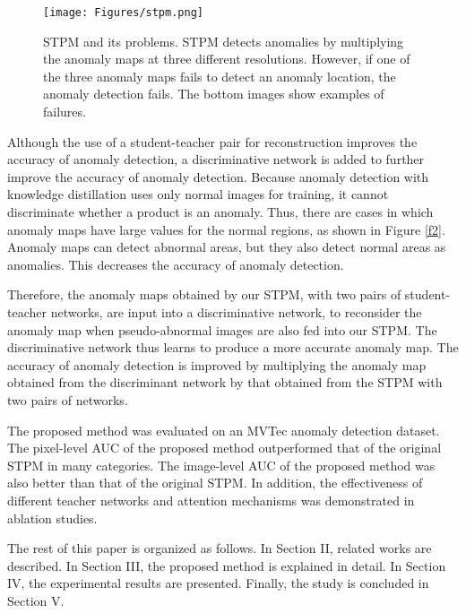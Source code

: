 \documentclass[letterpaper, 10 pt, conference]{ieeeconf}
\begin{document}
\begin{figure}[t]
\begin{center}
\vspace{0.2cm}
\texttt{[image: Figures/stpm.png]}
\end{center}

\caption{STPM and its problems. STPM detects anomalies by multiplying the anomaly maps at three different resolutions. However, if one of the three anomaly maps fails to detect an anomaly location, the anomaly detection fails. The bottom images show examples of failures.}
\label{f1}
\end{figure}

Although the use of a student-teacher pair for reconstruction improves the accuracy of anomaly detection, a discriminative network is added to further improve the accuracy of anomaly detection. Because anomaly detection with knowledge distillation uses only normal images for training, it cannot discriminate whether a product is an anomaly. Thus, there are cases in which anomaly maps have large values for the normal regions, as shown in Figure \ref{f2}. Anomaly maps can detect abnormal areas, but they also detect normal areas as anomalies. This decreases the accuracy of anomaly detection.

Therefore, the anomaly maps obtained by our STPM, with two pairs of student-teacher networks, are input into a discriminative network, to reconsider the anomaly map when pseudo-abnormal images are also fed into our STPM.
The discriminative network thus learns to produce a more accurate anomaly map. The accuracy of anomaly detection is improved by multiplying the anomaly map obtained from the discriminant network by that obtained from the STPM with two pairs of networks. 

The proposed method was evaluated on an MVTec anomaly detection dataset\cite{c2}. The pixel-level AUC of the proposed method outperformed that of the original STPM in many categories. The image-level AUC of the proposed method was also better than that of the original STPM. In addition, the effectiveness of different teacher networks and attention mechanisms was demonstrated in ablation studies. 


The rest of this paper is organized as follows. In Section II, related works are described. In Section III, the proposed method is explained in detail. In Section IV, the experimental results are presented. Finally, the study is concluded in Section V.
\end{document}
